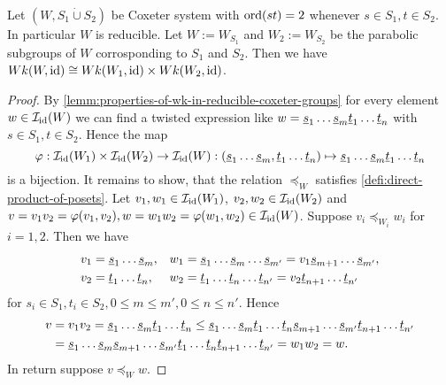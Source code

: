 \begin{coro}
	Let $(W,S_1 \dot \cup S_2)$ be Coxeter system with $\operatorname{ord}(st) = 2$ whenever $s \in S_1, t \in S_2$. In particular $W$ is reducible. Let $W := W_{S_1}$ and $W_2 := W_{S_2}$ be the parabolic subgroups of $W$ corrosponding to $S_1$ and $S_2$. Then we have $Wk(W,\operatorname{id}) \cong Wk(W_1,\operatorname{id}) \times Wk(W_2,\operatorname{id})$.

	\begin{proof}
		By \ref{lemm:properties-of-wk-in-reducible-coxeter-groups} for every element $w \in \mathcal{I}_{\operatorname{id}}(W)$ we can find a twisted expression like $w = \underline{s}_1 \ldots \underline{s}_m \underline{t}_1 \ldots \underline{t}_n$ with $s \in S_1, t \in S_2$. Hence the map
		$$ \varphi : \mathcal{I}_{\operatorname{id}}(W_1) \times \mathcal{I}_{\operatorname{id}}(W_2) \to \mathcal{I}_{\operatorname{id}}(W) : (\underline{s}_1 \ldots \underline{s}_m, \underline{t}_1 \ldots \underline{t}_n) \mapsto \underline{s}_1 \ldots \underline{s}_m \underline{t}_1 \ldots \underline{t}_n $$
		is a bijection. It remains to show, that the relation $\preceq_W$ satisfies \ref{defi:direct-product-of-posets}. Let $v_1,w_1 \in \mathcal{I}_{\operatorname{id}}(W_1)$, $v_2,w_2 \in \mathcal{I}_{\operatorname{id}}(W_2)$ and $v = v_1v_2 = \varphi(v_1,v_2), w = w_1w_2 = \varphi(w_1,w_2) \in \mathcal{I}_{\operatorname{id}}(W)$. Suppose $v_i \preceq_{W_i} w_i$ for $i=1,2$. Then we have
		\begin{align*}
			v_1	& = \underline{s}_1 \ldots \underline{s}_m, &
			w_1	& = \underline{s}_1 \ldots \underline{s}_m \ldots \underline{s}_{m'} = v_1 \underline{s}_{m+1} \ldots \underline{s}_{m'}, \\
			v_2	& = \underline{t}_1 \ldots \underline{t}_n, &
			w_2	& = \underline{t}_1 \ldots \underline{t}_n \ldots \underline{t}_{n'} = v_2 \underline{t}_{n+1} \ldots \underline{t}_{n'} \\
		\end{align*}
		for $s_i \in S_1, t_i \in S_2, 0 \leq m \leq m', 0 \leq n \leq n'$. Hence
		\begin{align*}
			v	& = v_1 v_2 = \underline{s}_1 \ldots \underline{s}_m \underline{t}_1 \ldots \underline{t}_n  \leq \underline{s}_1 \ldots \underline{s}_m \underline{t}_1 \ldots \underline{t}_n \underline{s}_{m+1} \ldots \underline{s}_{m'} \underline{t}_{n+1} \ldots \underline{t}_{n'} \\
				& = \underline{s}_1 \ldots \underline{s}_m \underline{s}_{m+1} \ldots \underline{s}_{m'} \underline{t}_1 \ldots \underline{t}_n  \underline{t}_{n+1} \ldots \underline{t}_{n'} = w_1 w_2 = w.
		\end{align*}
		In return suppose $v \preceq_W w$. \todo
	\end{proof}
\end{coro}